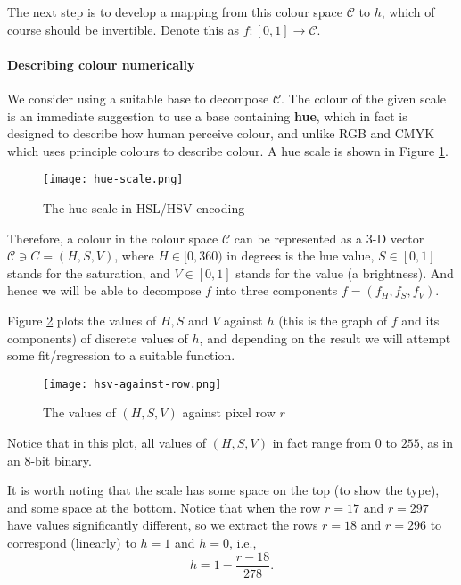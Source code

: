 The next step is to develop a mapping from this colour space \(\mathcal{C}\) to \(h\), which of course should be invertible. Denote this as \(f: [0, 1] \to \mathcal{C}\).

\paragraph{Describing colour numerically}

We consider using a suitable base to decompose \(\mathcal{C}\). The colour of the given scale is an immediate suggestion to use a base containing \textbf{hue}, which in fact is designed to describe how human perceive colour, and unlike RGB and CMYK which uses principle colours to describe colour. A hue scale is shown in Figure \ref{fig:hue-scale}.

\begin{figure}[htp]
    \centering
    \texttt{[image: hue-scale.png]}
    \caption{The hue scale in HSL/HSV encoding}
    \label{fig:hue-scale}
\end{figure}

Therefore, a colour in the colour space \(\mathcal{C}\) can be represented as a 3-D vector \(\mathcal{C} \ni C = (H, S, V)\), where \(H \in [0, 360)\) in degrees is the hue value, \(S \in [0, 1]\) stands for the saturation, and \(V \in [0, 1]\) stands for the value (a brightness). And hence we will be able to decompose \(f\) into three components \(f = \left(f_H, f_S, f_V\right)\).

Figure \ref{fig:hsv-against-row} plots the values of \(H, S\) and \(V\) against \(h\) (this is the graph of \(f\) and its components) of discrete values of \(h\), and depending on the result we will attempt some fit/regression to a suitable function.

\begin{figure}[htp]
    \centering
    \texttt{[image: hsv-against-row.png]}
    \caption{The values of \((H, S, V)\) against pixel row \(r\)}
    \label{fig:hsv-against-row}
\end{figure}

Notice that in this plot, all values of \((H, S, V)\) in fact range from \(0\) to \(255\), as in an 8-bit binary.

It is worth noting that the scale has some space on the top (to show the type), and some space at the bottom. Notice that when the row \(r = 17\) and \(r = 297\) have values significantly different, so we extract the rows \(r = 18\) and \(r = 296\) to correspond (linearly) to \(h = 1\) and \(h = 0\), i.e.,
\[
    h = 1 - \frac{r - 18}{278}.
\]

